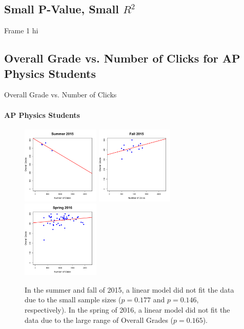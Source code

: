 \documentclass[xcolor=x11names,compress]{beamer}
\begin{document}
\subsection{Small P-Value, Small $R^2$}
\begin{frame}{Frame 1}
 hi
\end{frame}

\subsection{Overall Grade vs. Number of Clicks for AP Physics Students}
\begin{frame}{Overall Grade vs. Number of Clicks}
	\framesubtitle{AP Physics Students}
	\begin{figure}
		\centering
		\includegraphics[width=0.33\textwidth]{img/overall_grade_vs_clicks_su15_ap_students.pdf}
		\includegraphics[width=0.33\textwidth]{img/overall_grade_vs_clicks_fa15_ap_students.pdf}
		\includegraphics[width=0.33\textwidth]{img/overall_grade_vs_clicks_sp16_ap_students.pdf}
		\caption{In the summer and fall of 2015, a linear model did not fit the data due to the small sample sizes ($p = 0.177$ and $p = 0.146$, respectively). In the spring of 2016, a linear model did not fit the data due to the large range of Overall Grades ($p = 0.165$).}
		\label{fig:overall_grade_vs_clicks_ap_students}
	\end{figure}
\end{frame}

\end{document}
